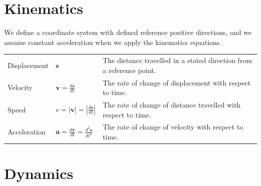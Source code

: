 \documentclass[a4paper,11pt]{article}
\begin{document}
	\section{Kinematics}
	We define a coordinate system with defined reference positive directions, and we assume constant acceleration when we apply the kinematics equations.
	\begin{center}
		\renewcommand{\arraystretch}{1.2}
		\begin{tabular}{@{} l l p{9.1cm} @{}}
			\toprule
			Displacement & $\textbf{s}$ & The distance travelled in a stated direction from a reference point. \\
			Velocity & $\displaystyle \textbf{v} = \frac{d\textbf{s}}{dt}$ & The rate of change of displacement with respect to time.\\
			\rule{0pt}{20pt}Speed & $\displaystyle v=\left|\textbf{v}\right| = \left|\frac{d\textbf{s}}{dt}\right|$ & The rate of change of distance travelled with respect to time. \\
			\rule{0pt}{20pt}Acceleration &  $\displaystyle \textbf{a} = \frac{d\textbf{v}}{dt} = \frac{d^2\textbf{s}}{dt^2}$ & The rate of change of velocity with respect to time. \\
			\bottomrule
		\end{tabular}
	\end{center}
	
	\section{Dynamics}
\end{document}
